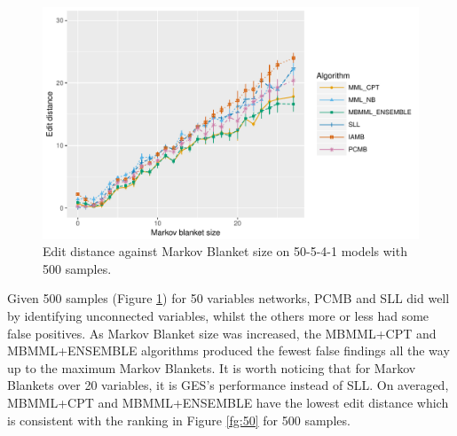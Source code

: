 \documentclass{svmult}
\begin{document}
\begin{figure}[hbt]
  \centering
    \includegraphics[scale=0.6]{figures/ed_vs_mbsize_50_5_4_1_500.pdf}
  \caption{Edit distance against Markov Blanket size on 50-5-4-1 models with 500 samples.}
  \label{fg:ed_mb_50_500}
\end{figure} 
Given 500 samples (Figure \ref{fg:ed_mb_50_500}) for 50 variables networks, PCMB and SLL did well by identifying unconnected variables, whilst the others more or less had some false positives. As Markov Blanket size was increased, the MBMML+CPT and MBMML+ENSEMBLE algorithms produced the fewest false findings all the way up to the maximum Markov Blankets. It is worth noticing that for Markov Blankets over 20 variables, it is GES's performance instead of SLL. On averaged, MBMML+CPT and MBMML+ENSEMBLE have the lowest edit distance which is consistent with the ranking in Figure \ref{fg:50} for 500 samples. 
\end{document}
